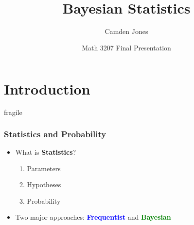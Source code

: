 \documentclass[article]{beamer}
\title{Bayesian Statistics}
\author{Camden Jones \newline {\footnotesize}}
\institute{Middle Georgia State University \newline Email: camden.jones1@mga.edu \vspace{.2cm}}
\date{\scriptsize{Math 3207 Final Presentation}}
\begin{document}
\maketitle


\section{Introduction}  %

\begin{frame}{fragile}
\frametitle{Statistics and Probability}
\begin{itemize}
    \item What is \textbf{Statistics}?
    \vspace{1cm}
    \begin{enumerate}
        \item Parameters
        \vspace{0.5cm}
        \item Hypotheses
        \vspace{0.5cm}
        \item Probability
    \end{enumerate}
    \vspace{1cm}
    \item Two major approaches: \textbf{\textcolor{blue}{Frequentist}} and \textbf{\textcolor{green}{Bayesian}}
\end{itemize}    
\end{frame}
\end{document}
